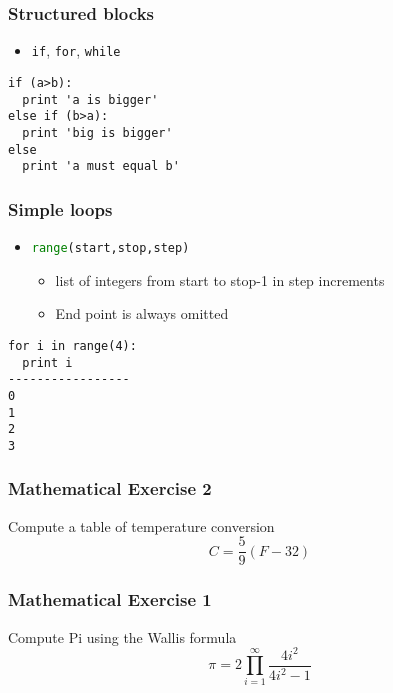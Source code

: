 \documentclass[xcolor=table,10pt,final]{beamer}
\begin{document}
\begin{frame}
  \frametitle{Structured blocks}
  \begin{itemize}
    \item {\tt if}, {\tt for}, {\tt while}
  \end{itemize}
\begin{lstlisting}
if (a>b):
  print 'a is bigger'
else if (b>a):
  print 'big is bigger'
else
  print 'a must equal b'
\end{lstlisting}
\end{frame}

\begin{frame}[fragile]
  \frametitle{Simple loops}
  \begin{itemize}
    \item \lstinline[language=python]|range(start,stop,step)|
      \begin{itemize}
        \item list of integers from start to stop-1 in step increments
        \item End point is always omitted
      \end{itemize}
  \end{itemize}
\begin{lstlisting}
for i in range(4):
  print i
-----------------
0
1
2
3
\end{lstlisting}
\end{frame}

\begin{frame}
  \frametitle{Mathematical Exercise 2}
  Compute a table of temperature conversion
  \vskip1cm
  \begin{equation*}
    C = \frac{5}{9}\left(F - 32\right)
  \end{equation*}
\end{frame}

\begin{frame}
  \frametitle{Mathematical Exercise 1}
  Compute Pi using the Wallis formula
  \vskip1cm
  \begin{equation*}
    \pi = 2\prod^{\infty}_{i=1}\frac{4i^2}{4i^2-1}
  \end{equation*}
\end{frame}
\end{document}
